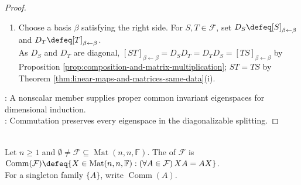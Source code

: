 \begin{theorem}
\begin{proof}
\begin{enumerate}[label=\roman*.]
If $T\in\mathcal{F}$ and $\mathbf{x}\in E_{\lambda}(S)$, then $S(T\mathbf{x})=T(S\mathbf{x})=\lambda T\mathbf{x}$ by commutation. Thus $E_{\lambda}(S)\in\operatorname{Inv}(T)$.\\
Set $\mathcal{F}_{\lambda}\defeq\{T|_{E_{\lambda}(S)}:T\in\mathcal{F}\}$. This family is finite, nonempty, and commuting.\\
Its members are diagonalizable by Lemma \ref{lem:diagonalizable-restriction-to-invariant-subspace}(ii). By induction, $E_{\lambda}(S)$ has a common eigenbasis for $\mathcal{F}_{\lambda}$.\\
Concatenating these bases over $\lambda\in\operatorname{spec}(S)$ forms a basis of $\mathcal{V}$ by Theorem \ref{thm:direct-sum-iff-dimensions-add}(ii).\\
The concatenated basis diagonalizes every member of $\mathcal{F}$.
\item[$(\Leftarrow)$] Choose a basis $\beta$ satisfying the right side. For $S,T\in\mathcal{F}$, set $D_S\defeq[S]_{\beta\leftarrow\beta}$ and $D_T\defeq[T]_{\beta\leftarrow\beta}$.\\
As $D_S$ and $D_T$ are diagonal, $[ST]_{\beta\leftarrow\beta}=D_SD_T=D_TD_S=[TS]_{\beta\leftarrow\beta}$ by Proposition \ref{prop:composition-and-matrix-multiplication}; $ST=TS$ by Theorem \ref{thm:linear-maps-and-matrices-same-data}(i).
\end{enumerate}
: A nonscalar member supplies proper common invariant eigenspaces for dimensional induction.\\
: Commutation preserves every eigenspace in the diagonalizable splitting.
\end{proof}
\end{theorem}

\begin{definition} \label{def:matrix-commutant} \\
Let $n\geq1$ and $\emptyset\neq\mathcal{F}\subseteq\operatorname{Mat}(n,n,\mathbb{F})$. The  of $\mathcal{F}$ is $\operatorname{Comm}(\mathcal{F})\defeq\{X\in\operatorname{Mat}(n,n,\mathbb{F}):(\forall A\in\mathcal{F})\,XA=AX\}$.\\
For a singleton family $\{A\}$, write $\operatorname{Comm}(A)$.
\end{definition}

